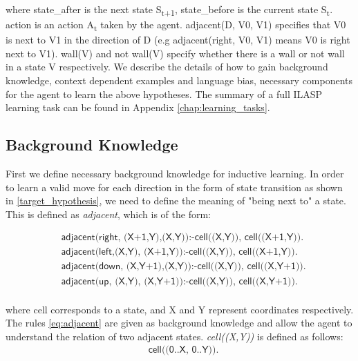 where \textsf{state\_after} is the next state S\textsubscript{t+1}, \textsf{state\_before} is the current state S\textsubscript{t}. \textsf{action} is an action A\textsubscript{t} taken by the agent.
\textsf{adjacent(D, V0, V1)} specifies that V0 is next to V1 in the direction of D (e.g \textsf{adjacent(right, V0, V1)} means V0 is right next to V1). 
\textsf{wall(V)} and \textsf{not wall(V)} specify whether there is a wall or not wall in a state V respectively.
We describe the details of how to gain background knowledge, context dependent examples and language bias, necessary components for the agent to learn the above hypotheses.
The summary of a full ILASP learning task can be found in Appendix \ref{chap:learning_tasks}.

\subsection{Background Knowledge}
\label{subsec:background_knowledge}
First we define necessary background knowledge for inductive learning.
In order to learn a valid move for each direction in the form of state transition as shown in \ref{target_hypothesis}, we need to define the meaning of "being next to" a state.
This is defined as \textit{adjacent}, which is of the form:

\begin{equation} \label{eq:adjacent}
\begin{split}
&\textsf{adjacent(right, (X+1,Y),(X,Y)):-cell((X,Y)), cell((X+1,Y)).} \\
&\textsf{adjacent(left,(X,Y),  (X+1,Y)):-cell((X,Y)), cell((X+1,Y)).} \\
&\textsf{adjacent(down, (X,Y+1),(X,Y)):-cell((X,Y)), cell((X,Y+1)).} \\
&\textsf{adjacent(up,   (X,Y),  (X,Y+1)):-cell((X,Y)), cell((X,Y+1)).} \\
\end{split}
\end{equation}

where \textsf{cell} corresponds to a state, and \textsf{X} and \textsf{Y} represent coordinates respectively.
The rules \ref{eq:adjacent} are given as background knowledge and allow the agent to understand the relation of two adjacent states.
\textit{cell((X,Y))} is defined as follows:
\begin{equation} \label{eq:cell}
\begin{split}
    &\textsf{cell((0..X, 0..Y)).}
\end{split}
\end{equation}

